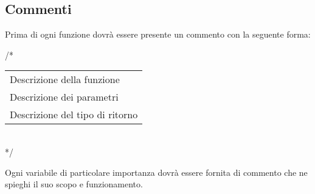\subsection{Commenti}

Prima di ogni funzione dovrà essere presente un commento con la seguente forma:

\begin{flushleft}
/*\\
\vspace{3mm}
\begin{tabular}{l}
	Descrizione della funzione\\
	Descrizione dei parametri\\		
	Descrizione del tipo di ritorno\\
\end{tabular}\\
\vspace{3mm}
*/

\end{flushleft}

Ogni variabile di particolare importanza dovrà essere fornita di commento che ne spieghi il suo scopo e funzionamento.

